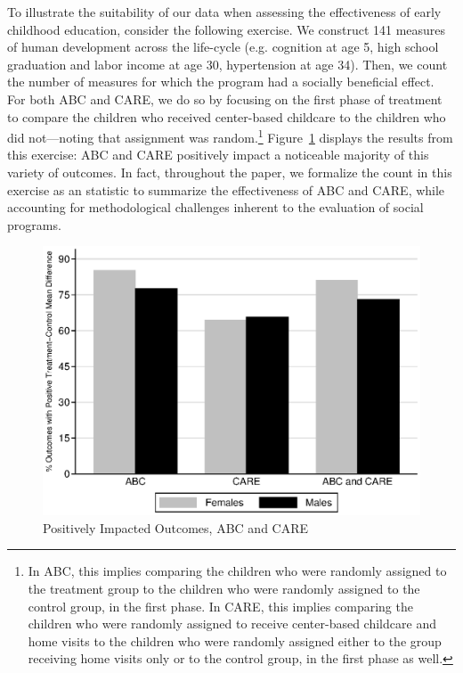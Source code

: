 \noindent To illustrate the suitability of our data when assessing the effectiveness of early childhood education, consider the following exercise. We construct 141 measures of human development across the life-cycle (e.g. cognition at age 5, high school graduation and labor income at age 30, hypertension at age 34). Then, we count the number of measures for which the program had a socially beneficial effect. For both ABC and CARE, we do so by focusing on the first phase of treatment to compare the children who received center-based childcare to the children who did not---noting that assignment was random.\footnote{In ABC, this implies comparing the children who were randomly assigned to the treatment group to the children who were randomly assigned to the control group, in the first phase. In CARE, this implies comparing the children who were randomly assigned to receive center-based childcare and home visits to the children who were randomly assigned either to the group receiving home visits only or to the control group, in the first phase as well.} Figure~\ref{fig:ppositive} displays the results from this exercise: ABC and CARE positively impact a noticeable majority of this variety of outcomes. In fact, throughout the paper, we formalize the count in this exercise as an statistic to summarize the effectiveness of ABC and CARE, while accounting for methodological challenges inherent to the evaluation of social programs.

\begin{figure}[H]
		\caption{Positively Impacted Outcomes, ABC and CARE} \label{fig:ppositive}
		\includegraphics[width=.9\columnwidth]{output/abccare_positiveeffects.eps}
\end{figure}


